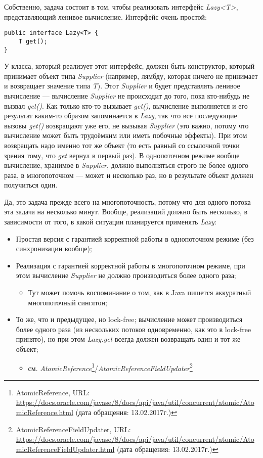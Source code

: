 \documentclass[a5paper]{article}
\begin{document}
Собственно, задача состоит в том, чтобы реализовать интерфейс \textit{Lazy<T>}, представляющий ленивое вычисление. Интерфейс очень простой:
\begin{verbatim}
public interface Lazy<T> {
    T get();
}
\end{verbatim}
У класса, который реализует этот интерфейс, должен быть конструктор, который принимает объект типа \textit{Supplier} (например, лямбду, которая ничего не принимает и возвращает значение типа \textit{T}). Этот \textit{Supplier} и будет представлять ленивое вычисление --- вычисление \textit{Supplier} не происходит до того, пока кто-нибудь не вызвал \textit{get()}. Как только кто-то вызывает \textit{get()}, вычисление выполняется и его результат каким-то образом запоминается в \textit{Lazy}, так что все последующие вызовы \textit{get()} возвращают уже его, не вызывая \textit{Supplier} (это важно, потому что вычисление может быть трудоёмким или иметь побочные эффекты). При этом возвращать надо именно тот же объект (то есть равный со ссылочной точки зрения тому, что \textit{get} вернул в первый раз). В однопоточном режиме вообще вычисление, хранимое в \textit{Supplier}, должно выполняться строго не более одного раза, в многопоточном --- может и несколько раз, но в результате объект должен получиться один.

Да, это задача прежде всего на многопоточность, потому что для одного потока эта задача на несколько минут. Вообще, реализаций должно быть несколько, в зависимости от того, в какой ситуации планируется применять \textit{Lazy}:
\begin{itemize}
	\item Простая версия с гарантией корректной работы в однопоточном режиме (без синхронизации вообще);
	\item Реализация с гарантией корректной работы в многопоточном режиме, при этом вычисление \textit{Supplier} не должно производиться более одного раза;
	\begin{itemize}
		\item Тут может помочь воспоминание о том, как в Java пишется аккуратный многопоточный синглтон;
	\end{itemize}
	\item То же, что и предыдущее, но lock-free; вычисление может производиться более одного
		раза (из нескольких потоков одновременно, как это в lock-free принято), но при этом \textit{Lazy.get} всегда должен возвращать один и тот же объект;
	\begin{itemize}
		\item см. \textit{AtomicReference}\footnote{AtomicReference, URL: \url{https://docs.oracle.com/javase/8/docs/api/java/util/concurrent/atomic/AtomicReference.html} (дата обращения: 13.02.2017г.)}/\textit{AtomicReferenceFieldUpdater}\footnote{AtomicReferenceFieldUpdater, URL: \url{https://docs.oracle.com/javase/8/docs/api/java/util/concurrent/atomic/AtomicReferenceFieldUpdater.html} (дата обращения: 13.02.2017г.)}
	\end{itemize}
\end{itemize}
\end{document}
